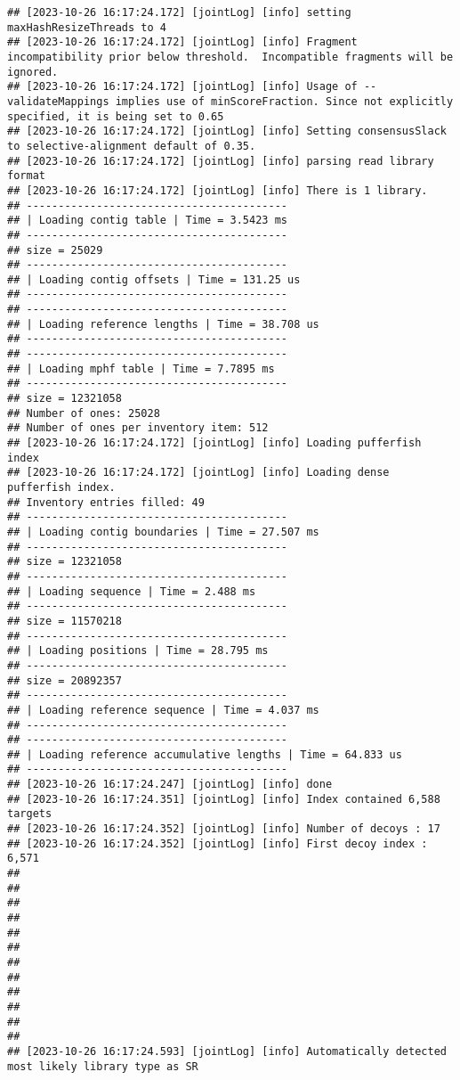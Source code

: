 \documentclass[
]{book}
\begin{document}
\begin{verbatim}
## [2023-10-26 16:17:24.172] [jointLog] [info] setting maxHashResizeThreads to 4
## [2023-10-26 16:17:24.172] [jointLog] [info] Fragment incompatibility prior below threshold.  Incompatible fragments will be ignored.
## [2023-10-26 16:17:24.172] [jointLog] [info] Usage of --validateMappings implies use of minScoreFraction. Since not explicitly specified, it is being set to 0.65
## [2023-10-26 16:17:24.172] [jointLog] [info] Setting consensusSlack to selective-alignment default of 0.35.
## [2023-10-26 16:17:24.172] [jointLog] [info] parsing read library format
## [2023-10-26 16:17:24.172] [jointLog] [info] There is 1 library.
## -----------------------------------------
## | Loading contig table | Time = 3.5423 ms
## -----------------------------------------
## size = 25029
## -----------------------------------------
## | Loading contig offsets | Time = 131.25 us
## -----------------------------------------
## -----------------------------------------
## | Loading reference lengths | Time = 38.708 us
## -----------------------------------------
## -----------------------------------------
## | Loading mphf table | Time = 7.7895 ms
## -----------------------------------------
## size = 12321058
## Number of ones: 25028
## Number of ones per inventory item: 512
## [2023-10-26 16:17:24.172] [jointLog] [info] Loading pufferfish index
## [2023-10-26 16:17:24.172] [jointLog] [info] Loading dense pufferfish index.
## Inventory entries filled: 49
## -----------------------------------------
## | Loading contig boundaries | Time = 27.507 ms
## -----------------------------------------
## size = 12321058
## -----------------------------------------
## | Loading sequence | Time = 2.488 ms
## -----------------------------------------
## size = 11570218
## -----------------------------------------
## | Loading positions | Time = 28.795 ms
## -----------------------------------------
## size = 20892357
## -----------------------------------------
## | Loading reference sequence | Time = 4.037 ms
## -----------------------------------------
## -----------------------------------------
## | Loading reference accumulative lengths | Time = 64.833 us
## -----------------------------------------
## [2023-10-26 16:17:24.247] [jointLog] [info] done
## [2023-10-26 16:17:24.351] [jointLog] [info] Index contained 6,588 targets
## [2023-10-26 16:17:24.352] [jointLog] [info] Number of decoys : 17
## [2023-10-26 16:17:24.352] [jointLog] [info] First decoy index : 6,571 
## 
## 
## 
## 
## 
## 
## 
## 
## 
## 
## 
## 
## [2023-10-26 16:17:24.593] [jointLog] [info] Automatically detected most likely library type as SR

\end{verbatim}
\end{document}

